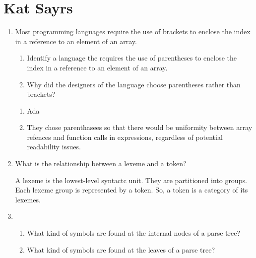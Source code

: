 
\chapter{Kat Sayrs}

\begin{enumerate}
  \item Most programming languages require the use of brackets to
    enclose the index in a reference to an element of an array.
  \begin{enumerate}
    \item Identify a language the requires the use of parentheses
      to enclose the index in a reference to an element of an array.
    \item Why did the designers of the language choose parentheses
      rather than brackets?
    \end{enumerate}

  \begin{answer}

  \begin{enumerate}
    \item Ada
    \item They chose parenthasees so that there would be uniformity between array refences and function calls in expressions, regardless of potential readability issues.
    \end{enumerate}

    \end{answer}
    
  \item What is the relationship between a lexeme and a token?

  \begin{answer}

    A lexeme is the lowest-level syntactc unit. They are partitioned into groups.
Each lexeme group is represented by a token. So, a token is a category of its lexemes.

    \end{answer}

  \item
  \begin{enumerate}
    \item What kind of symbols are found at the internal nodes of a
      parse tree?
    \item What kind of symbols are found at the leaves of a parse tree?
    \end{enumerate}

  \begin{answer}


\end{answer}
\end{enumerate}
